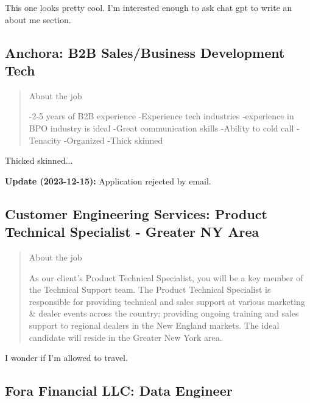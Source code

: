 \documentclass[
	letterpaper, %
	12pt, %
]{CSSullivanBusinessReport}
\begin{document}
This one looks pretty cool. I'm interested enough to ask chat gpt to write an about me section. 


\subsection[Anchora]{Anchora: B2B Sales/Business Development Tech}

\begin{quote}
	About the job
	
	-2-5 years of B2B experience
	-Experience tech industries
	-experience in BPO industry is ideal
	-Great communication skills
	-Ability to cold call
	-Tenacity
	-Organized
	-Thick skinned

\end{quote}

Thicked skinned...

\textbf{Update (2023-12-15):} Application rejected by email.


\subsection[Customer Engineering Services]{Customer Engineering Services: Product Technical Specialist - Greater NY Area}

\begin{quote}
	About the job
	
	As our client's Product Technical Specialist, you will be a key member of the Technical Support team. The Product Technical Specialist is responsible for providing technical and sales support at various marketing \& dealer events across the country; providing ongoing training and sales support to regional dealers in the New England markets. The ideal candidate will reside in the Greater New York area.

\end{quote}

I wonder if I'm allowed to travel. 


\subsection[Fora Financial LLC]{Fora Financial LLC: Data Engineer}
\end{document}
